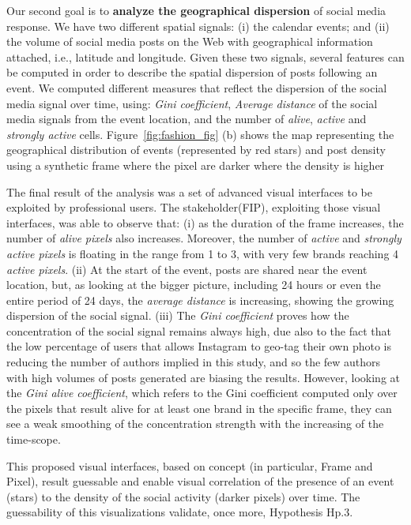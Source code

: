 {Our second goal is to \textbf{analyze the geographical dispersion} of social media response. We have two different spatial signals: (i) the calendar events; and (ii) the volume of social media posts on the Web with geographical information attached, i.e., latitude and longitude. Given these two signals, several features can be computed in order to describe the spatial dispersion of posts following an event. 
We computed different measures that reflect the dispersion of the social media signal over time, using: \emph{Gini coefficient}, \emph{Average distance} of the social media signals from the event location, and the number of \emph{alive}, \emph{active} and \emph{strongly active} cells.
Figure~\ref{fig:fashion_fig} (b) shows the  map representing the geographical distribution of events (represented by red stars) and post density using a synthetic frame where the pixel are darker where the density is higher

The final result of the analysis was a set of advanced visual interfaces to be exploited by professional users.
The stakeholder(FIP), exploiting those visual interfaces, was able to observe that: (i) as the duration of the frame increases, the number of \emph{alive pixels} also increases. Moreover, the number of \emph{active} and \emph{strongly active pixels} is floating in the range from 1 to 3, with very few brands reaching 4 \emph{active pixels}. (ii) At the start of the event, posts are shared near the event location, but, as looking at the bigger picture, including 24 hours or even the entire period of 24 days, the \emph{average distance} is increasing, showing the growing dispersion of the social signal. (iii) The \emph{Gini coefficient} proves how the concentration of the social signal remains always high, due also to the fact that the low percentage of users that allows Instagram to geo-tag their own photo is reducing the number of authors implied in this study, and so the few authors with high volumes of posts generated are biasing the results. However, looking at the \emph{Gini alive coefficient}, which refers to the Gini coefficient computed only over the pixels that result alive for at least one brand in the specific frame, they can see a weak smoothing of the concentration strength with the increasing of the time-scope.

This proposed visual interfaces, based on \frappe{} concept (in particular, Frame and Pixel), result guessable and enable visual correlation of the presence of an event (stars) to the density of the social activity (darker pixels) over time.
The guessability of this visualizations validate, once more, Hypothesis \textsf{Hp.3}.

}
